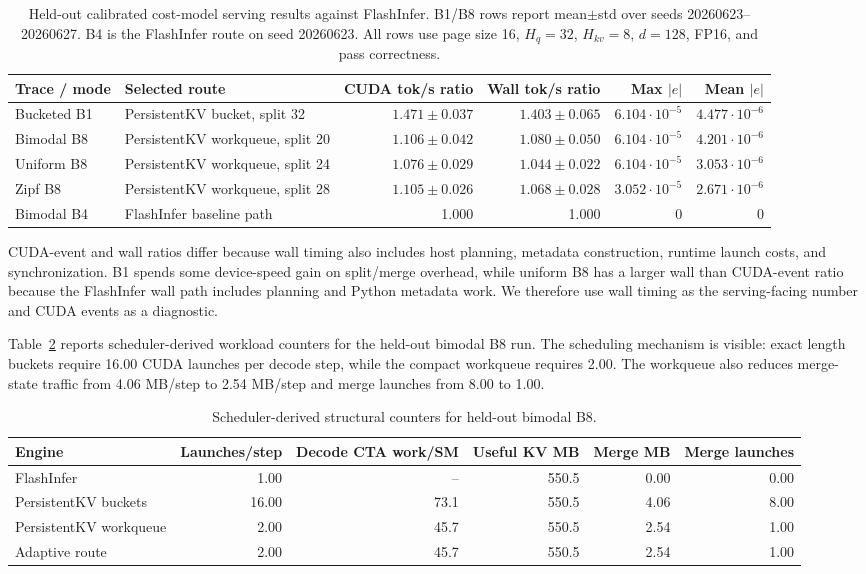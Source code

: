 \documentclass[10pt]{article}
\begin{document}
\begin{table}[t]
\centering
\caption{Held-out calibrated cost-model serving results against FlashInfer. B1/B8
rows report mean$\pm$std over seeds 20260623--20260627. B4 is the
FlashInfer route on seed 20260623. All rows use page size 16, $H_q=32$,
$H_{kv}=8$, $d=128$, FP16, and pass correctness.}
\label{tab:main}
\small
\begin{tabular}{llrrrr}
\toprule
Trace / mode & Selected route & CUDA tok/s ratio & Wall tok/s ratio & Max $|e|$ & Mean $|e|$ \\
\midrule
Bucketed B1 & PersistentKV bucket, split 32 & $1.471{\pm}0.037$ & $1.403{\pm}0.065$ & $6.104{\cdot}10^{-5}$ & $4.477{\cdot}10^{-6}$ \\
Bimodal B8 & PersistentKV workqueue, split 20 & $1.106{\pm}0.042$ & $1.080{\pm}0.050$ & $6.104{\cdot}10^{-5}$ & $4.201{\cdot}10^{-6}$ \\
Uniform B8 & PersistentKV workqueue, split 24 & $1.076{\pm}0.029$ & $1.044{\pm}0.022$ & $6.104{\cdot}10^{-5}$ & $3.053{\cdot}10^{-6}$ \\
Zipf B8 & PersistentKV workqueue, split 28 & $1.105{\pm}0.026$ & $1.068{\pm}0.028$ & $3.052{\cdot}10^{-5}$ & $2.671{\cdot}10^{-6}$ \\
Bimodal B4 & FlashInfer baseline path & 1.000 & 1.000 & 0 & 0 \\
\bottomrule
\end{tabular}
\end{table}

CUDA-event and wall ratios differ because wall timing also includes host
planning, metadata construction, runtime launch costs, and synchronization. B1
spends some device-speed gain on split/merge overhead, while uniform B8 has a
larger wall than CUDA-event ratio because the FlashInfer wall path includes
planning and Python metadata work. We therefore use wall timing as the
serving-facing number and CUDA events as a diagnostic.

Table~\ref{tab:causal} reports scheduler-derived workload counters for the
held-out bimodal B8 run. The scheduling mechanism is visible: exact length
buckets require 16.00 CUDA launches per decode step, while the compact
workqueue requires 2.00. The workqueue also reduces merge-state traffic from
4.06 MB/step to 2.54 MB/step and merge launches from 8.00 to 1.00.

\begin{table}[t]
\centering
\caption{Scheduler-derived structural counters for held-out bimodal B8.}
\label{tab:causal}
\small
\begin{tabular}{lrrrrr}
\toprule
Engine & Launches/step & Decode CTA work/SM & Useful KV MB & Merge MB & Merge launches \\
\midrule
FlashInfer & 1.00 & -- & 550.5 & 0.00 & 0.00 \\
PersistentKV buckets & 16.00 & 73.1 & 550.5 & 4.06 & 8.00 \\
PersistentKV workqueue & 2.00 & 45.7 & 550.5 & 2.54 & 1.00 \\
Adaptive route & 2.00 & 45.7 & 550.5 & 2.54 & 1.00 \\
\bottomrule
\end{tabular}
\end{table}
\end{document}

